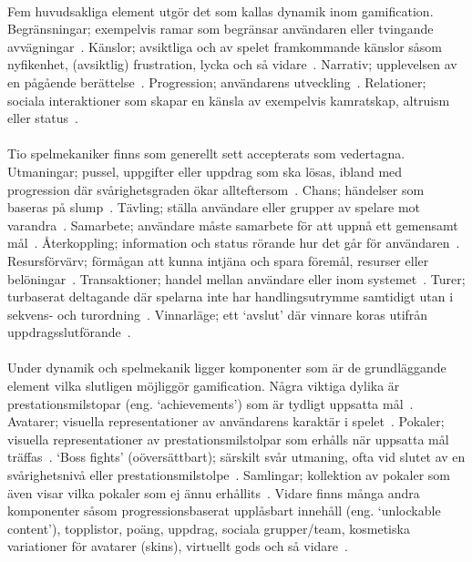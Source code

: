 \paragraph{}
\hspace{-11}Fem huvudsakliga element utgör det som kallas dynamik inom gamification.
Begränsningar; exempelvis ramar som begränsar användaren eller tvingande avvägningar~\cite{Cwil2018}.
Känslor; avsiktliga och av spelet framkommande känslor såsom nyfikenhet, (avsiktlig) frustration, lycka och så vidare~\cite{Cwil2018}.
Narrativ; upplevelsen av en pågående berättelse~\cite{Cwil2018}.
Progression; användarens utveckling~\cite{Cwil2018}.
Relationer; sociala interaktioner som skapar en känsla av exempelvis kamratskap, altruism eller status~\cite{Cwil2018}.
\paragraph{}
\hspace{-11}Tio spelmekaniker finns som generellt sett accepterats som vedertagna.
Utmaningar; pussel, uppgifter eller uppdrag som ska lösas, ibland med progression där svårighetsgraden ökar allteftersom~\cite{Cwil2018}.
Chans; händelser som baseras på slump~\cite{Cwil2018}.
Tävling; ställa användare eller grupper av spelare mot varandra~\cite{Cwil2018}.
Samarbete; användare måste samarbete för att uppnå ett gemensamt mål~\cite{Cwil2018}.
Återkoppling; information och status rörande hur det går för användaren~\cite{Cwil2018}.
Resursförvärv; förmågan att kunna intjäna och spara föremål, resurser eller belöningar~\cite{Cwil2018}.
Transaktioner; handel mellan användare eller inom systemet~\cite{Cwil2018}.
Turer; turbaserat deltagande där spelarna inte har handlingsutrymme samtidigt utan i sekvens- och turordning~\cite{Cwil2018}.
Vinnarläge; ett \lq{}avslut\rq{} där vinnare koras utifrån uppdragsslutförande~\cite{Cwil2018}.
\paragraph{}
\hspace{-11}Under dynamik och spelmekanik ligger komponenter som är de grundläggande element vilka slutligen möjliggör gamification.
Några viktiga dylika är prestationsmilstopar (eng. \lq{}achievements\rq{}) som är tydligt uppsatta mål~\cite{Cwil2018}.
Avatarer; visuella representationer av användarens karaktär i spelet~\cite{Cwil2018}.
Pokaler; visuella representationer av prestationsmilstolpar som erhålls när uppsatta mål träffas~\cite{Cwil2018}.
\lq{}Boss fights\rq{} (oöversättbart); särskilt svår utmaning, ofta vid slutet av en svårighetsnivå eller prestationsmilstolpe~\cite{Cwil2018}.
Samlingar; kollektion av pokaler som även visar vilka pokaler som ej ännu erhållits~\cite{Cwil2018}.
Vidare finns många andra komponenter såsom progressionsbaserat upplåsbart innehåll (eng. \lq{}unlockable content\rq{}), topplistor, poäng, uppdrag, sociala grupper/team, kosmetiska variationer för avatarer (skins), virtuellt gods och så vidare~\cite{Bae2014, Cwil2018}.

